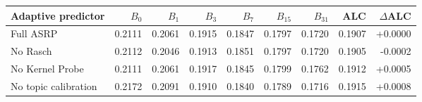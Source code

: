 \begin{tabular}{lrrrrrrrr}
\toprule
Adaptive predictor & $B_0$ & $B_1$ & $B_3$ & $B_7$ & $B_{15}$ & $B_{31}$ & ALC & $\Delta$ALC\\
\midrule
Full ASRP & 0.2111 & 0.2061 & 0.1915 & 0.1847 & 0.1797 & 0.1720 & 0.1907 & +0.0000\\
No Rasch & 0.2112 & 0.2046 & 0.1913 & 0.1851 & 0.1797 & 0.1720 & 0.1905 & -0.0002\\
No Kernel Probe & 0.2111 & 0.2061 & 0.1917 & 0.1845 & 0.1799 & 0.1762 & 0.1912 & +0.0005\\
No topic calibration & 0.2172 & 0.2091 & 0.1910 & 0.1840 & 0.1789 & 0.1716 & 0.1915 & +0.0008\\
\bottomrule
\end{tabular}
